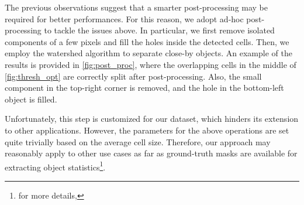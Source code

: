 The previous observations suggest that a smarter post-processing may be required for better performances.
For this reason, we adopt ad-hoc post-processing to tackle the issues above.
In particular, we first remove isolated components of a few pixels and fill the holes inside the detected cells. 
Then, we employ the watershed algorithm \cite{watershed} to separate close-by objects.
An example of the results is provided in \cref{fig:post_proc}, where the overlapping cells in the middle of \cref{fig:thresh_opt} are correctly split after post-processing. Also, the small component in the top-right corner is removed, and the hole in the bottom-left object is filled.

Unfortunately, this step is customized for our dataset, which hinders its extension to other applications.
However, the parameters for the above operations are set quite trivially based on the average cell size.
Therefore, our approach may reasonably apply to other use cases as far as ground-truth masks are available for extracting object statistics\footnote{for more details, \postproc}.